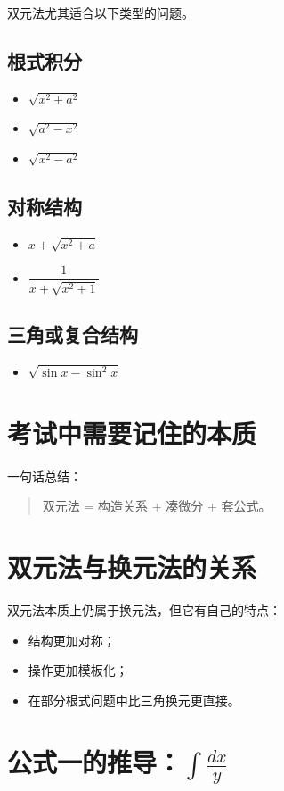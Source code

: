 \documentclass[UTF8,a4paper,12pt]{ctexart}
\begin{document}
双元法尤其适合以下类型的问题。

\subsection{根式积分}
\begin{itemize}
  \item $\sqrt{x^2+a^2}$
  \item $\sqrt{a^2-x^2}$
  \item $\sqrt{x^2-a^2}$
\end{itemize}

\subsection{对称结构}
\begin{itemize}
  \item $x+\sqrt{x^2+a}$
  \item $\dfrac{1}{x+\sqrt{x^2+1}}$
\end{itemize}

\subsection{三角或复合结构}
\begin{itemize}
  \item $\sqrt{\sin x-\sin^2 x}$
\end{itemize}

\section{考试中需要记住的本质}

一句话总结：

\begin{quote}
  双元法 = 构造关系 + 凑微分 + 套公式。
\end{quote}

\section{双元法与换元法的关系}

双元法本质上仍属于换元法，但它有自己的特点：
\begin{itemize}
  \item 结构更加对称；
  \item 操作更加模板化；
  \item 在部分根式问题中比三角换元更直接。
\end{itemize}

\section{公式一的推导：$\int \frac{dx}{y}$}
\end{document}
